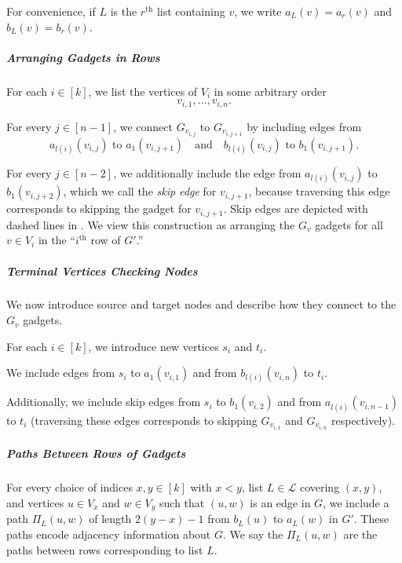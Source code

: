 \documentclass[11pt]{article}
\newcommand{\ca}{\mathcal}
\theoremstyle{definition}
\begin{document}
    For convenience, if $L$ is the $r^{\text{th}}$ list containing $v$, we write $a_L(v) = a_r(v)$ and $b_L(v) = b_r(v)$.


    \subparagraph{Arranging Gadgets in Rows}\hfill


    For each $i\in [k]$, we list the vertices of $V_i$ in some arbitrary order
        \[v_{i,1}, \dots, v_{i,n}.\]



    For every $j\in [n-1]$, we connect $G_{v_{i,j}}$ to $G_{v_{i,j+1}}$ by  including edges from 
    \[a_{l(i)}(v_{i,j})\text{ to }a_1(v_{i,j+1})\quad \text{and} \quad b_{l(i)}(v_{i,j})\text{ to }b_1(v_{i,j+1}).\]
    
    For every $j\in [n-2]$, we additionally include the edge  from $a_{l(i)}(v_{i,j})$ to $b_{1}(v_{i,j+2})$, which we call the  \emph{skip edge} for $v_{i,j+1}$, because traversing this edge corresponds to skipping the gadget for $v_{i,j+1}$.
    Skip edges are depicted with dashed lines in .
    We view this construction as arranging the $G_v$ gadgets for all $v\in V_i$ in the ``$i^{\text{th}}$ row of $G'$.''



    \subparagraph{Terminal Vertices Checking Nodes}\hfill

    We now introduce source and target nodes and describe how they connect to the $G_v$ gadgets.

For each $i\in [k]$, we introduce new vertices $s_i$ and $t_i$.

    We include edges from $s_i$ to $a_1(v_{i,1})$ and from $b_{l(i)}(v_{i,n})$ to $t_i$.

    Additionally, we include skip edges from $s_i$ to $b_1(v_{i,2})$ and from $a_{l(i)}(v_{i,n-1})$ to $t_i$ (traversing these edges corresponds to skipping $G_{v_{i,1}}$ and $G_{v_{i,n}}$ respectively).

        \subparagraph{Paths Between Rows of Gadgets}\hfill
        
    For every choice of indices $x,y\in [k]$ with $x<y$, list $L\in\ca{L}$ covering $(x,y)$, and vertices $u\in V_x$  and $w\in V_y$ such that $(u,w)$ is an edge in $G$, we include a path 
        $\Pi_L(u,w)$ of length $2(y-x) - 1$ from $b_L(u)$ to $a_L(w)$ in $G'$.
    These paths encode adjacency information about $G$.
    We say the $\Pi_L(u,w)$ are the paths between rows corresponding to list $L$.
    
\end{document}

